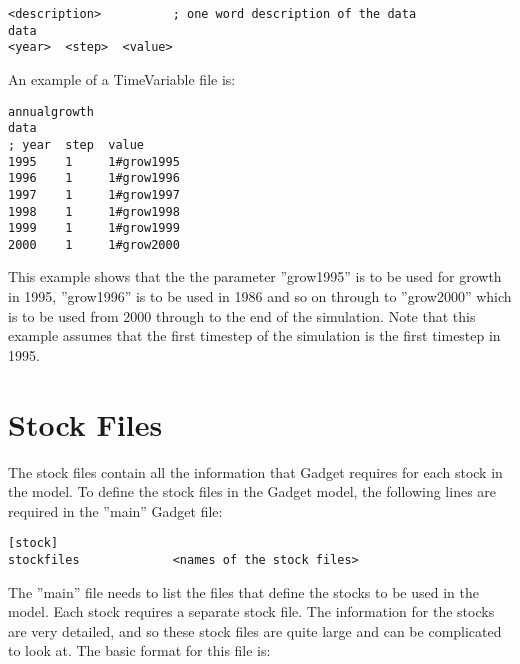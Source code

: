 \documentclass [a4paper, 10pt]{book}
\begin{document}
{\small\begin{verbatim}
<description>          ; one word description of the data
data
<year>  <step>  <value>
\end{verbatim}}

An example of a TimeVariable file is:

{\small\begin{verbatim}
annualgrowth
data
; year  step  value
1995    1     1#grow1995
1996    1     1#grow1996
1997    1     1#grow1997
1998    1     1#grow1998
1999    1     1#grow1999
2000    1     1#grow2000
\end{verbatim}}

This example shows that the the parameter ''grow1995'' is to be used for growth in 1995, ''grow1996'' is to be used in 1986 and so on through to ''grow2000'' which is to be used from 2000 through to the end of the simulation.  Note that this example assumes that the first timestep of the simulation is the first timestep in 1995.

\chapter{Stock Files}\label{chap:stock}
The stock files contain all the information that Gadget requires for each stock in the model.  To define the stock files in the Gadget model, the following lines are required in the ''main'' Gadget file:

{\small\begin{verbatim}
[stock]
stockfiles             <names of the stock files>
\end{verbatim}}



The ''main'' file needs to list the files that define the stocks to be used in the model.  Each stock requires a separate stock file.  The information for the stocks are very detailed, and so these stock files are quite large and can be complicated to look at.  The basic format for this file is:
\end{document}
